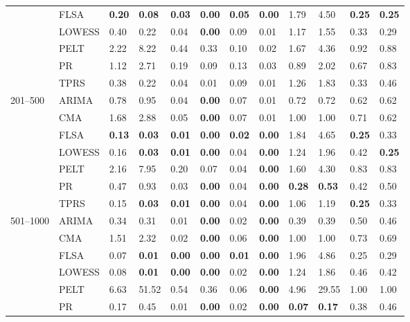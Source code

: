 \begin{table}[ht]
\begin{tabular}{llllllllllll}
   & FLSA & \textbf{0.20} & \textbf{0.08} & \textbf{0.03} & \textbf{0.00} & \textbf{0.05} & \textbf{0.00} & 1.79 & 4.50 & \textbf{0.25} & \textbf{0.25} \\ 
   & LOWESS & 0.40 & 0.22 & 0.04 & \textbf{0.00} & 0.09 & 0.01 & 1.17 & 1.55 & 0.33 & 0.29 \\ 
   & PELT & 2.22 & 8.22 & 0.44 & 0.33 & 0.10 & 0.02 & 1.67 & 4.36 & 0.92 & 0.88 \\ 
   & PR & 1.12 & 2.71 & 0.19 & 0.09 & 0.13 & 0.03 & 0.89 & 2.02 & 0.67 & 0.83 \\ 
   & TPRS & 0.38 & 0.22 & 0.04 & 0.01 & 0.09 & 0.01 & 1.26 & 1.83 & 0.33 & 0.46 \\ 
  201–500 & ARIMA & 0.78 & 0.95 & 0.04 & \textbf{0.00} & 0.07 & 0.01 & 0.72 & 0.72 & 0.62 & 0.62 \\ 
   & CMA & 1.68 & 2.88 & 0.05 & \textbf{0.00} & 0.07 & 0.01 & 1.00 & 1.00 & 0.71 & 0.62 \\ 
   & FLSA & \textbf{0.13} & \textbf{0.03} & \textbf{0.01} & \textbf{0.00} & \textbf{0.02} & \textbf{0.00} & 1.84 & 4.65 & \textbf{0.25} & 0.33 \\ 
   & LOWESS & 0.16 & \textbf{0.03} & \textbf{0.01} & \textbf{0.00} & 0.04 & \textbf{0.00} & 1.24 & 1.96 & 0.42 & \textbf{0.25} \\ 
   & PELT & 2.16 & 7.95 & 0.20 & 0.07 & 0.04 & \textbf{0.00} & 1.60 & 4.30 & 0.83 & 0.83 \\ 
   & PR & 0.47 & 0.93 & 0.03 & \textbf{0.00} & 0.04 & \textbf{0.00} & \textbf{0.28} & \textbf{0.53} & 0.42 & 0.50 \\ 
   & TPRS & 0.15 & \textbf{0.03} & \textbf{0.01} & \textbf{0.00} & 0.04 & \textbf{0.00} & 1.06 & 1.19 & \textbf{0.25} & 0.33 \\ 
  501–1000 & ARIMA & 0.34 & 0.31 & 0.01 & \textbf{0.00} & 0.02 & \textbf{0.00} & 0.39 & 0.39 & 0.50 & 0.46 \\ 
   & CMA & 1.51 & 2.32 & 0.02 & \textbf{0.00} & 0.06 & \textbf{0.00} & 1.00 & 1.00 & 0.73 & 0.69 \\ 
   & FLSA & 0.07 & \textbf{0.01} & \textbf{0.00} & \textbf{0.00} & \textbf{0.01} & \textbf{0.00} & 1.96 & 4.86 & 0.25 & 0.29 \\ 
   & LOWESS & 0.08 & \textbf{0.01} & \textbf{0.00} & \textbf{0.00} & 0.02 & \textbf{0.00} & 1.24 & 1.86 & 0.46 & 0.42 \\ 
   & PELT & 6.63 & 51.52 & 0.54 & 0.36 & 0.06 & \textbf{0.00} & 4.96 & 29.55 & 1.00 & 1.00 \\ 
   & PR & 0.17 & 0.45 & 0.01 & \textbf{0.00} & 0.02 & \textbf{0.00} & \textbf{0.07} & \textbf{0.17} & 0.38 & 0.46 \\ 

\end{tabular}
\end{table}
